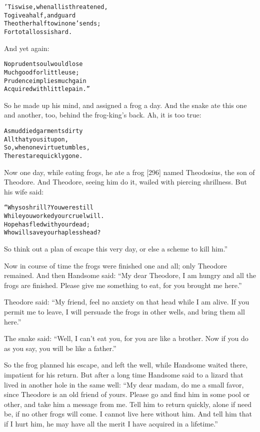 \documentclass{article}
\renewenvironment{verbatim}{\begin{alltt}\normalfont\begin{centering}}{\end{centering}\end{alltt}}
\begin{document}
\begin{verbatim}
'Tis wise, when all is threatened,
    To give a half, and guard
The other half to win one's ends;
    For total loss is hard.
\end{verbatim}
And yet again:

\begin{verbatim}
No prudent soul would lose
Much good for little use;
Prudence implies much gain
Acquired with little pain.”
\end{verbatim}
So he made up his mind, and assigned a frog a day. And the snake
ate this one and another, too, behind the frog-king's back. Ah, it
is too true:

\begin{verbatim}
As muddied garments dirty
    All that you sit upon,
So, when one virtue tumbles,
    The rest are quickly gone.
\end{verbatim}
Now one day, while eating frogs, he ate a frog [296] named
Theodosius, the son of Theodore. And Theodore, seeing him do it,
wailed with piercing shrillness. But his wife said:

\begin{verbatim}
“Why so shrill? You were still
While you worked your cruel will.
Hope has fled with your dead;
Who will save your hapless head?
\end{verbatim}
So think out a plan of escape this very day, or else a scheme to
kill him.”

Now in course of time the frogs were finished one and all; only
Theodore remained. And then Handsome said:
``My dear Theodore, I am hungry and all the frogs are finished. Please give me something to eat, for you brought me here.''

Theodore said:
``My friend, feel no anxiety on that head while I am alive. If you permit me to leave, I will persuade the frogs in other wells, and bring them all here.''

The snake said:
``Well, I can't eat you, for you are like a brother. Now if you do as you say, you will be like a father.''

So the frog planned his escape, and left the well, while Handsome
waited there, impatient for his return. But after a long time
Handsome said to a lizard that lived in another hole in the same
well:
``My dear madam, do me a small favor, since Theodore is an old friend of yours. Please go and find him in some pool or other, and take him a message from me. Tell him to return quickly, alone if need be, if no other frogs will come. I cannot live here without him. And tell him that if I hurt him, he may have all the merit I have acquired in a lifetime.''
\end{document}

